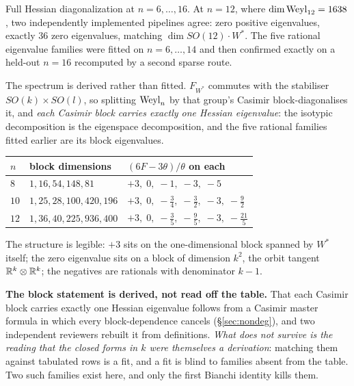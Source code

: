 \begin{certificate}
Full Hessian diagonalization at $n=6,\dots,16$. At $n=12$, where $\dim\mathrm{Weyl}_{12}=1638$, two independently implemented pipelines agree: zero positive eigenvalues, exactly $36$ zero eigenvalues, matching $\dim SO(12)\cdot W^{*}$. The five rational eigenvalue families were fitted on $n=6,\dots,14$ and then confirmed exactly on a held-out $n=16$ recomputed by a second sparse route.
\end{certificate}

The spectrum is derived rather than fitted. $F_{W^{*}}$ commutes with the stabiliser $SO(k)\times SO(l)$, so splitting $\mathrm{Weyl}_n$ by that group's Casimir block-diagonalises it, and \emph{each Casimir block carries exactly one Hessian eigenvalue}: the isotypic decomposition is the eigenspace decomposition, and the five rational families fitted earlier are its block eigenvalues.

\begin{center}
\begin{tabular}{@{}lll@{}}
\toprule
$n$ & block dimensions & $(6F-3\theta)/\theta$ on each \\
\midrule
$8$  & $1,16,54,148,81$        & $+3,\;0,\;-1,\;-3,\;-5$ \\
$10$ & $1,25,28,100,420,196$   & $+3,\;0,\;-\tfrac34,\;-\tfrac32,\;-3,\;-\tfrac92$ \\
$12$ & $1,36,40,225,936,400$   & $+3,\;0,\;-\tfrac35,\;-\tfrac95,\;-3,\;-\tfrac{21}5$ \\
\bottomrule
\end{tabular}
\end{center}

The structure is legible: $+3$ sits on the one-dimensional block spanned by $W^{*}$ itself; the zero eigenvalue sits on a block of dimension $k^2$, the orbit tangent $\mathbb{R}^k\otimes\mathbb{R}^k$; the negatives are rationals with denominator $k-1$.

\textbf{The block statement is derived, not read off the table.} That each Casimir block carries exactly one Hessian eigenvalue follows from a Casimir master formula in which every block-dependence cancels (\S\ref{sec:nondeg}), and two independent reviewers rebuilt it from definitions. \emph{What does not survive is the reading that the closed forms in $k$ were themselves a derivation}: matching them against tabulated rows is a fit, and a fit is blind to families absent from the table. Two such families exist here, and only the first Bianchi identity kills them.

